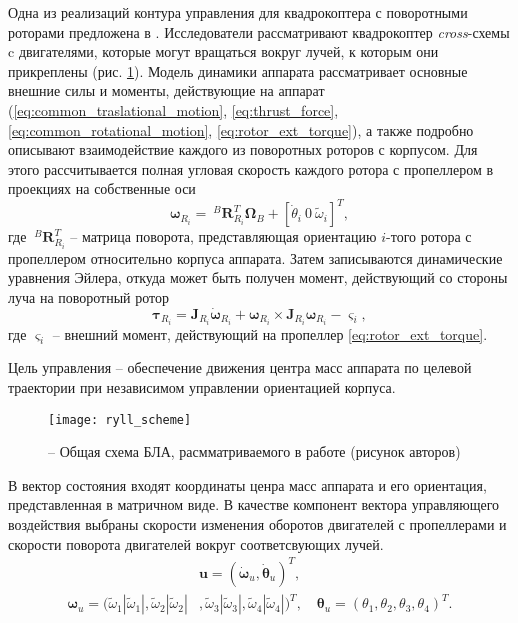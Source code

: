 Одна из реализаций контура управления для квадрокоптера с поворотными роторами предложена в \cite{Ryll01}. Исследователи рассматривают квадрокоптер \textit{cross}-схемы c двигателями, которые могут вращаться вокруг лучей, к которым они прикреплены (рис. \ref{fig:ryll_scheme}). Модель динамики аппарата рассматривает основные внешние силы и моменты, действующие на аппарат (\ref{eq:common_traslational_motion}, \ref{eq:thrust_force}, \ref{eq:common_rotational_motion}, \ref{eq:rotor_ext_torque}), а также подробно описывают взаимодействие каждого из поворотных роторов с корпусом. Для этого рассчитывается полная угловая скорость каждого ротора с пропеллером в проекциях на собственные оси
\begin{equation}
\bm{\omega}_{R_i} = ~^B\bm{R}_{R_i}^T \bm \Omega_B + [\dot{\theta}_i \ 0 \ \tilde \omega_i]^T,
\end{equation}
где $~^B\bm{R}_{R_i}^T$ -- матрица поворота, представляющая ориентацию $i$-того ротора с пропеллером
относительно корпуса аппарата.
Затем записываются динамические уравнения Эйлера, откуда может быть получен момент, действующий со стороны луча на поворотный ротор
\begin{equation}
\bm{\tau}_{R_i} = \bm J_{R_i} \dot{\bm \omega}_{R_i} +
{\bm \omega}_{R_i} \times \bm J_{R_i} {\bm \omega}_{R_i} - \bm \varsigma_i,
\end{equation}
где $\bm \varsigma_i$ -- внешний момент, действующий на пропеллер \eqref{eq:rotor_ext_torque}.

Цель управления -- обеспечение движения центра масс аппарата по целевой траектории при независимом управлении ориентацией корпуса. 
\begin{figure}[h!]
	\centering
	\texttt{[image: ryll\_scheme]}
	\caption{ -- Общая схема БЛА, расмматриваемого в работе \cite{Ryll01} (рисунок авторов)}
 	\label{fig:ryll_scheme}
\end{figure}

В вектор состояния входят координаты ценра масс аппарата и его ориентация, представленная в матричном виде.
В качестве компонент вектора управляющего воздействия выбраны скорости изменения оборотов двигателей с пропеллерами и скорости поворота двигателей вокруг соответсвующих лучей.
\begin{equation} \label{eq:ryll_ctrl_out}
\begin{aligned}
&\bm{u} = (\dot{\bm \omega}_u,  \dot{\bm \theta}_u)^T,
\\
\bm \omega_u =
(\tilde\omega_1 |\tilde\omega_1|,
\tilde\omega_2 |\tilde\omega_2|&,
\tilde\omega_3 |\tilde\omega_3|,
\tilde\omega_4 |\tilde\omega_4|)^T,
\quad
{\bm \theta}_u = (\theta_1, \theta_2 , \theta_3 , \theta_4 )^T.
\end{aligned}
\end{equation}

